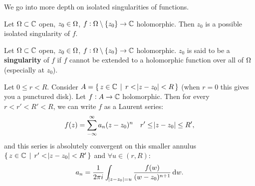 \setcounter{section}{0}
\setcounter{theorem}{0}


We go into more depth on isolated singularities of functions.


Let $\Omega \subset \mathbb{C}$ open, $z_0 \in \Omega$, $f: \Omega \setminus \{ z_0 \} \to \mathbb{C}$ holomorphic. Then $z_0$ is a possible isolated singularity of $f$.


\begin{definition}[Singularity]

Let $\Omega \subset \mathbb{C}$ open, $z_0 \in \Omega$, $f: \Omega \setminus \{ z_0 \} \to \mathbb{C}$ holomorphic. $z_0$ is said to be a \textbf{singularity} of $f$ if $f$ cannot be extended to a holomorphic function over all of $\Omega$ (especially at $z_0$).

\end{definition}


\begin{theorem}
Let $0 \leq r < R $. Consider $A = \set{ z\in \mathbb{C}\, \mid \, r< \abs{z-z_0} <R }$ (when $r=0$ this gives you a punctured disk). Let $f: A \to \mathbb{C}$ holomorphic. Then for every $r<r'<R'<R$, we can write $f$ as a Laurent series:
\begin{align*}
    f(z) &= \sum_{-\infty}^\infty a_n (z-z_0)^n & r' \leq \abs{z-z_0} \leq R',
\end{align*}
and this series is absolutely convergent on this smaller annulus $\set{ z\in \mathbb{C}\, \mid \, r'< \abs{z-z_0} <R' }$ and $\forall u \in (r,R)$:
\begin{align*}
    a_n = \frac{1}{2 \pi i} \int_{\abs{z-z_0}=u} \frac{f(w)}{(w-z_0)^{n+1}} \dif w.
\end{align*}
\end{theorem}


\begin{center}
\end{center}



